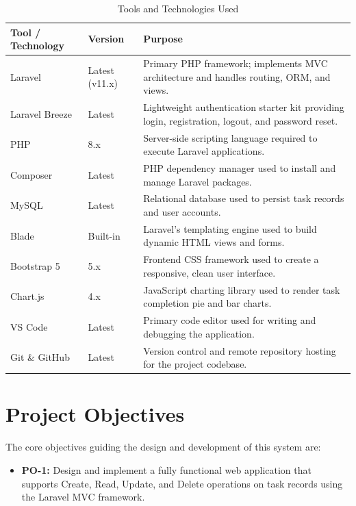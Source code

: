 \documentclass[12pt,a4paper]{report}
\begin{document}
\begin{titlepage}
\begin{table}[h!]
\centering
\caption{Tools and Technologies Used}
\label{tab:tools}
\renewcommand{\arraystretch}{1.3}
\begin{tabularx}{\textwidth}{@{}llX@{}}
\toprule
\textbf{Tool / Technology} & \textbf{Version} & \textbf{Purpose} \\
\midrule
Laravel       & Latest (v11.x)   & Primary PHP framework; implements MVC architecture and handles routing, ORM, and views. \\
Laravel Breeze & Latest          & Lightweight authentication starter kit providing login, registration, logout, and password reset. \\
PHP           & 8.x              & Server-side scripting language required to execute Laravel applications. \\
Composer      & Latest           & PHP dependency manager used to install and manage Laravel packages. \\
MySQL         & Latest           & Relational database used to persist task records and user accounts. \\
Blade         & Built-in         & Laravel's templating engine used to build dynamic HTML views and forms. \\
Bootstrap 5   & 5.x              & Frontend CSS framework used to create a responsive, clean user interface. \\
Chart.js      & 4.x              & JavaScript charting library used to render task completion pie and bar charts. \\
VS Code       & Latest           & Primary code editor used for writing and debugging the application. \\
Git \& GitHub & Latest           & Version control and remote repository hosting for the project codebase. \\
\bottomrule
\end{tabularx}
\end{table}

\section{Project Objectives}

The core objectives guiding the design and development of this system are:

\begin{itemize}[leftmargin=1.5cm]
    \item \textbf{PO-1:} Design and implement a fully functional web application that
    supports Create, Read, Update, and Delete operations on task records using the
    Laravel MVC framework.


\end{itemize}
\end{titlepage}
\end{document}
